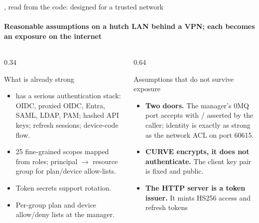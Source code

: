 \begin{frame}{\legacy{}, read from the code: designed for a trusted network}
    \framesubtitle{Reasonable assumptions on a hutch LAN behind a VPN; each becomes an exposure on the internet}
    \begin{columns}[T]
        \begin{column}{0.34\textwidth}
            \begin{exampleblock}{What is already strong}
                \scriptsize
                \begin{itemize}
                    \item {} has a serious authentication stack: OIDC, proxied OIDC,
                          Entra, SAML, LDAP, PAM; hashed API keys; refresh sessions; device-code flow.
                    \item 25 fine-grained scopes mapped from roles; principal $\to$ resource group for plan/device
                          allow-lists. 
                    \item Token secrets support rotation. 
                    \item Per-group plan and device allow/deny lists at the manager.
                \end{itemize}
            \end{exampleblock}
        \end{column}
        \begin{column}{0.64\textwidth}
            \begin{alertblock}{Assumptions that do not survive exposure}
                \scriptsize
                \begin{itemize}
                    \item \textbf{Two doors.} The manager's 0MQ port accepts  with
                          / asserted by the caller; identity is exactly as strong
                          as the network ACL on port 60615. 
                    \item \textbf{CURVE encrypts, it does not authenticate.} The client key pair is fixed and
                          public. 
                    \item \textbf{The HTTP server is a token issuer.} It mints HS256 access and refresh tokens

\end{itemize}
\end{alertblock}
\end{column}
\end{columns}
\end{frame}
